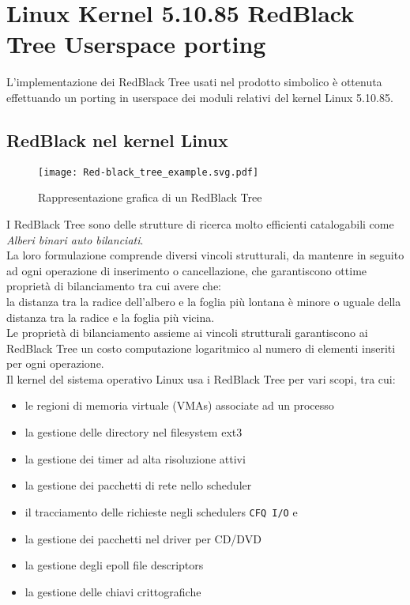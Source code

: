 \section{Linux Kernel 5.10.85 RedBlack Tree Userspace porting} \label{chSpMMAux:linuxRBTree}
L'implementazione dei RedBlack Tree usati nel prodotto simbolico è ottenuta effettuando un porting in 
userspace dei moduli relativi del kernel Linux 5.10.85.\\
\subsection{RedBlack nel kernel Linux}
\begin{figure}[H]
  \centering \texttt{[image: Red-black\_tree\_example.svg.pdf]}
  \caption{Rappresentazione grafica di un RedBlack Tree}
  \decoRule \label{fig:rbtree}
\end{figure}
I RedBlack Tree sono delle strutture di ricerca molto efficienti catalogabili come 
\emph{Alberi binari auto bilanciati}.\\%
La loro formulazione comprende diversi vincoli strutturali, da mantenre in seguito ad ogni operazione di inserimento o cancellazione,
che garantiscono ottime proprietà di bilanciamento tra cui avere che:\\ %
la distanza tra la radice dell'albero e la foglia più lontana è minore o uguale della distanza tra la radice e la foglia più vicina.\\
Le proprietà di bilanciamento assieme ai vincoli strutturali garantiscono ai RedBlack Tree
un costo computazione logaritmico al numero di elementi inseriti per ogni operazione.\\
\voidLine
Il kernel del sistema operativo Linux usa i RedBlack Tree per vari scopi, tra cui:
\begin{itemize}
	\item	le regioni di memoria virtuale (VMAs) associate ad un processo
	\item	la gestione delle directory nel filesystem ext3
	\item	la gestione dei timer ad alta risoluzione attivi
	\item	la gestione dei pacchetti di rete nello scheduler 
	\item	il tracciamento delle richieste negli schedulers \verb|CFQ I/O| e 
	\item	la gestione dei pacchetti nel driver per CD/DVD
	\item	la gestione degli epoll file descriptors
	\item	la gestione delle chiavi crittografiche
\end{itemize}  
